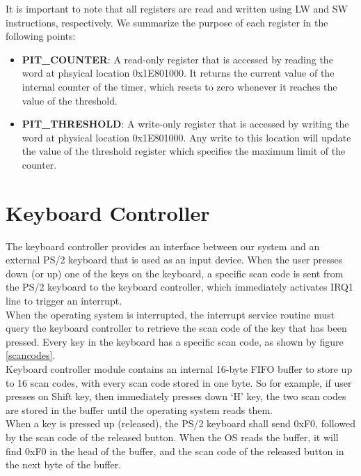 \documentclass[oneside]{book}
\begin{document}
It is important to note that all registers are read and written using
LW and SW instructions, respectively. We summarize the purpose of each
register in the following points:

\begin{itemize}

\item \textbf{PIT\_COUNTER}:
A read-only register that is accessed by reading the word at phsyical
location 0x1E801000. It returns the current value of the internal counter
of the timer, which resets to zero whenever it reaches the value of the
threshold.

\item \textbf{PIT\_THRESHOLD}:
A write-only register that is accessed by writing the word at physical
location 0x1E801000. Any write to this location will update the value
of the threshold register which specifies the maximum limit of the
counter.

\end{itemize}

\section{Keyboard Controller}

The keyboard controller provides an interface between our system and an
external PS/2 keyboard that is used as an input device. When the user
presses down (or up) one of the keys on the keyboard, a specific scan code
is sent from the PS/2 keyboard to the keyboard controller, which
immediately activates IRQ1 line to trigger an interrupt.\\

When the operating system is interrupted, the interrupt service routine
must query the keyboard controller to retrieve the scan code of the
key that has been pressed. Every key in the keyboard has a specific
scan code, as shown by figure \ref{scancodes}.\\

Keyboard controller module contains an internal 16-byte FIFO buffer
to store up to 16 scan codes, with every scan code stored in one
byte. So for example, if user presses on Shift key, then immediately
presses down `H' key, the two scan codes are stored in the buffer
until the operating system reads them.\\

When a key is pressed up (released), the PS/2 keyboard shall send
0xF0, followed by the scan code of the released button. When the OS
reads the buffer, it will find 0xF0 in the head of the buffer,
and the scan code of the released button in the next byte of the
buffer.\\
\end{document}
